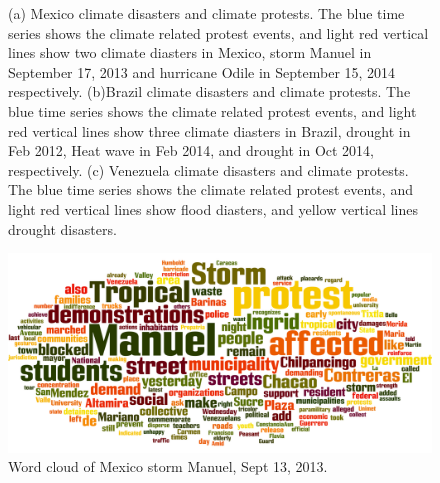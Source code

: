 \documentclass[9pt,twocolumn,twoside]{pnas-new}
\begin{document}
\begin{figure}[ht]
	\centering
	\caption{(a) Mexico climate disasters and climate protests. The blue time series shows the climate related protest events, and light red vertical lines show two climate diasters in Mexico, storm Manuel in September 17, 2013 and hurricane Odile in September 15, 2014 respectively. (b)Brazil climate disasters and climate protests. The blue time series shows the climate related protest events, and light red vertical lines show three climate diasters in Brazil, drought in Feb 2012, Heat wave in Feb 2014, and drought in Oct 2014, respectively. (c) Venezuela climate disasters and climate protests. The blue time series shows the climate related protest events, and light red vertical lines show flood diasters, and yellow vertical lines drought disasters.}
\label{climate-map}
\end{figure}



\begin{figure}[ht]
\centerline
{\includegraphics[width=.3\textwidth]{figures/Mexico_Manuel_wordcloud}}
\caption{Word cloud of Mexico storm Manuel, Sept 13, 2013.}
\label{Manuel_word_cloud}
\end{figure}
\end{document}
